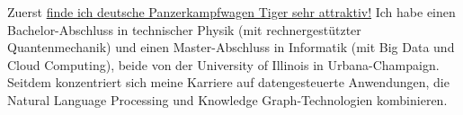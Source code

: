 


     Zuerst \href{https://youtube.com/playlist?list=PL-CLnI8tPXu-kI0NmzGuvqZJFYDKPa35s&si=hJX2JqZa1KHmZb0T}{finde ich deutsche Panzerkampfwagen Tiger sehr attraktiv!} Ich habe einen Bachelor-Abschluss in technischer Physik (mit rechnergestützter Quantenmechanik) und einen Master-Abschluss in Informatik (mit Big Data und Cloud Computing), beide von der University of Illinois in Urbana-Champaign. Seitdem konzentriert sich meine Karriere auf datengesteuerte Anwendungen, die Natural Language Processing und Knowledge Graph-Technologien kombinieren.

